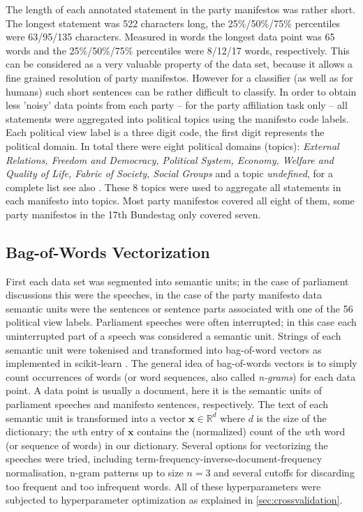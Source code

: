 \documentclass[runningheads,a4paper]{llncs}
\renewcommand{\vec}[1]{\mathbf{#1}}
\begin{document}
The length of each annotated statement in the party manifestos was rather short. The longest statement was 522 characters long, the 25\%/50\%/75\% percentiles were 63/95/135 characters. Measured in words the longest data point was 65 words and the 25\%/50\%/75\% percentiles were 8/12/17 words, respectively. This can be considered as a very valuable property of the data set, because it allows a fine grained resolution of party manifestos. However for a classifier (as well as for humans) such short sentences can be rather difficult to classify. In order to obtain less 'noisy' data points from each party -- for the party affiliation task only -- all statements were aggregated into political topics using the manifesto code labels. Each political view label is a three digit code, the first digit represents the political domain. In total there were eight political domains (topics): {\em External Relations, Freedom and Democracy, Political System, Economy, Welfare and Quality of Life, Fabric of Society, Social Groups} and a topic {\em undefined}, for a complete list see also \cite{leftright}. These 8 topics were used to aggregate all statements in each manifesto into topics. Most party manifestos covered all eight of them, some party manifestos in the 17th Bundestag only covered seven. 

\subsection{Bag-of-Words Vectorization}\label{sec:bow-vectorization}
First each data set was segmented into semantic units; in the case of parliament discussions this were the speeches, in the case of the party manifesto data semantic units were the sentences or sentence parts associated with one of the 56 political view labels.  Parliament speeches were often interrupted; in this case each uninterrupted part of a speech was considered a semantic unit. Strings of each semantic unit were tokenised and transformed into bag-of-word vectors as implemented in scikit-learn \cite{scikit-learn}. The general idea of bag-of-words vectors is to simply count occurrences of words (or word sequences, also called {\em n-grams}) for each data point. A data point is usually a document, here it is the semantic units of parliament speeches and manifesto sentences, respectively. The text of each semantic unit is transformed into a vector $\vec{x}\in\mathds{R}^d$ where $d$ is the size of the dictionary; the $w$th entry of $\vec{x}$ contains the (normalized) count of the $w$th word (or sequence of words) in our dictionary. Several options for vectorizing the speeches were tried, including term-frequency-inverse-document-frequency normalisation, n-gram patterns up to size $n=3$ and several cutoffs for discarding too frequent and too infrequent words. All of these hyperparameters were subjected to hyperparameter optimization as explained in \autoref{sec:crossvalidation}. 
\end{document}
